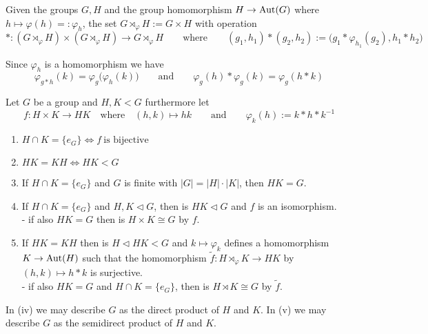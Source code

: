 \begin{definition}
   Given the groups \(G, H\) and the group homomorphism \(H \to \operatorname{Aut}(G)\) where \(h \mapsto \varphi(h) =: \varphi_h\), the set \(G \rtimes_\varphi H := G \times H\) with operation
   \[\ast: (G \rtimes_\varphi H) \times (G \rtimes_\varphi H) \to G \rtimes_\varphi H \qquad\text{where}\qquad (g_1, h_1) \ast (g_2, h_2) := \big(g_1 \ast \varphi_{h_1}(g_2), h_1 \ast h_2\big)\]
\end{definition}
\begin{remark}
   Since \(\varphi_h\) is a homomorphism we have
   \[\varphi_{g \ast h}(k) = \varphi_g\big(\varphi_h(k)\big) \qquad\text{and}\qquad \varphi_g(h) \ast \varphi_g(k) = \varphi_g(h \ast k)\]
\end{remark}

\begin{proposition}\label{pro:dir_semidir_prod}
   Let \(G\) be a group and \(H, K < G\) furthermore let
   \[f: H \times K \to HK \quad\text{where}\quad (h,k) \mapsto hk \qquad\text{and}\qquad \varphi_k(h) := k \ast h \ast k^{-1}\]

   \begin{enumerate}[label=\roman*, align=Center]
      \item \(H \cap K = \{e_G\} \iff f~\text{is bijective}\)
      \item \(HK = KH \iff HK < G\)
      \item If \(H \cap K = \{e_G\}\) and \(G\) is finite with \(|G| = |H| \cdot |K|\), then \(HK = G\).
      \item If \(H \cap K = \{e_G\}\) and \(H, K \triangleleft G\), then is \(HK \triangleleft G\) and \(f\) is an isomorphism. \\
      - if also \(HK = G\) then is \(H \times K \cong G\) by \(f\).
      \item If \(HK = KH\) then is \(H \triangleleft HK < G\) and \(k \mapsto \varphi_k\) defines a homomorphism \(K \to \operatorname{Aut}(H)\) such that the homomorphism \(\tilde{f}: H \rtimes_{\varphi} K \to HK\) by \((h,k) \mapsto h \ast k\) is surjective.\\
         - if also \(HK = G\) and \(H\cap K = \{e_G\}\), then is \(H \rtimes K \cong G\) by \(\tilde{f}\).
   \end{enumerate}
\end{proposition}
\begin{remark}
   In (iv) we may describe \(G\) as the direct product of \(H\) and \(K\).
   In (v) we may describe \(G\) as the semidirect product of \(H\) and \(K\).
\end{remark}

